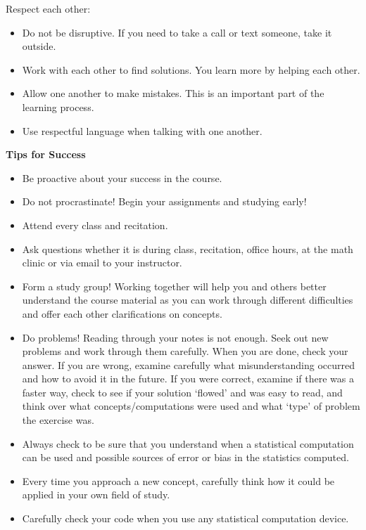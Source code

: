 \documentclass[11pt,letterpaper]{article}
\newcommand{\lefthead}[2]{\noindent\textbf{#1}\hfill\\[#2]}
\begin{document}
\noindent Respect each other:
\begin{itemize}
\item Do not be disruptive. If you need to take a call or text someone, take it outside.
\item Work with each other to find solutions. You learn more by helping each other.
\item Allow one another to make mistakes. This is an important part of the learning process.
\item Use respectful language when talking with one another.
\end{itemize} \vspace{0.3cm}





\lefthead{Tips for Success}{0cm}
	\begin{itemize}
	\item Be proactive about your success in the course.
	\item Do not procrastinate! Begin your assignments and studying early!
	\item Attend every class and recitation.
	\item Ask questions whether it is during class, recitation, office hours, at the math clinic or via email to your instructor.
	\item Form a study group! Working together will help you and others better understand the course material as you can work through different difficulties and offer each other clarifications on concepts. 
	\item Do problems! Reading through your notes is not enough. Seek out new problems and work through them carefully. When you are done, check your answer. If you are wrong, examine carefully what misunderstanding occurred and how to avoid it in the future. If you were correct, examine if there was a faster way, check to see if your solution `flowed' and was easy to read, and think over what concepts/computations were used and what `type' of problem the exercise was. 
	\item Always check to be sure that you understand when a statistical computation can be used and possible sources of error or bias in the statistics computed. 
	\item Every time you approach a new concept, carefully think how it could be applied in your own field of study.
	\item Carefully check your code when you use any statistical computation device. \\
	\end{itemize}
\end{document}
